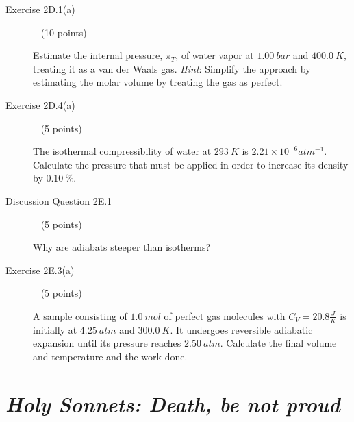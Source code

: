 \documentclass[12pt, openany, letterpaper]{memoir}
\begin{document}
\begin{description}
	      \vspace{20em}
	\item [Exercise 2D.1(a)] ~ (10 points)

	      Estimate the internal pressure, $\pi_T$, of water vapor at $1.00~bar$ and $400.0~K$, treating it as a van der Waals gas. \emph{Hint}: Simplify the approach by estimating the molar volume by treating the gas as perfect.

	      \vspace{20em}
	\item [Exercise 2D.4(a)] ~ (5 points)

	      The isothermal compressibility of water at $293~K$ is $2.21\times10^{-6}atm^{-1}$. Calculate the pressure that must be applied in order to increase its density by $0.10~\%$.

	      \vspace{12em}
	\item [Discussion Question 2E.1] ~ (5 points)

	      Why are adiabats steeper than isotherms?

	      \vspace{10em}
	\item [Exercise 2E.3(a)] ~ (5 points)

	      A sample consisting of $1.0~mol$ of perfect gas molecules with $C_V=20.8\frac{J}{K}$ is initially at $4.25~atm$ and $300.0~K$. It undergoes reversible adiabatic expansion until its pressure reaches $2.50~atm$. Calculate the final volume and temperature and the work done.
\end{description}

\newpage
\pagestyle{empty}
\addtocounter{page}{-1}
\section*{\emph{Holy Sonnets: Death, be not proud}}
\end{document}

